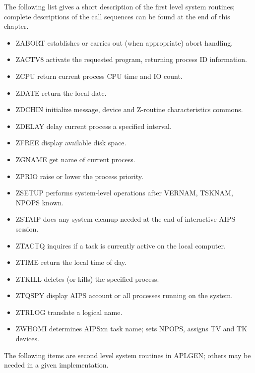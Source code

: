 The following list gives a short description of the first level system
routines; complete descriptions of the call sequences can be found at
the end of this chapter.
\begin{itemize} %
\item ZABORT  establishes or carries out (when
appropriate) abort handling.
\item ZACTV8  activate the requested program, returning
process ID information.
\item ZCPU    return current process CPU time and IO
count.
\item ZDATE   return the local date.
\item ZDCHIN  initialize message, device and Z-routine
characteristics commons.
\item ZDELAY  delay current process a specified
interval.
\item ZFREE   display available disk space.
\item ZGNAME  get name of current process.
\item ZPRIO   raise or lower the process priority.
\item ZSETUP  performs system-level operations after
VERNAM, TSKNAM, NPOPS known.
\item ZSTAIP  does any system cleanup needed at the end
of interactive AIPS session.
\item ZTACTQ  inquires if a task is currently active on
the local computer.
\item ZTIME   return the local time of day.
\item ZTKILL  deletes (or kills) the specified process.
\item ZTQSPY  display AIPS account or all processes
running on the system.
\item ZTRLOG  translate a logical name.
\item ZWHOMI  determines AIPSxn task name; sets NPOPS,
assigns TV and TK devices.
\end{itemize} %

The following items are second level system routines in APLGEN;
others may be needed in a given implementation.


